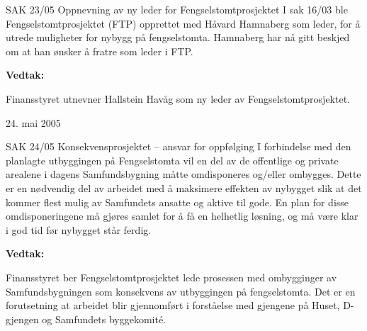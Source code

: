 \begin{instruksledd}{SAK 23/05 Oppnevning av ny leder for Fengselstomtprosjektet}
    I sak 16/03 ble Fengselstomtprosjektet (FTP) opprettet med Håvard Hamnaberg som leder,
    for å utrede muligheter for
    nybygg på fengselstomta. Hamnaberg har nå gitt beskjed om at han ønsker å fratre som
    leder i FTP.

    \textbf{Vedtak:}

    Finansstyret utnevner Hallstein Havåg som ny leder av Fengselstomtprosjektet.
    
    24. mai 2005
\end{instruksledd}
\begin{instruksledd}{SAK 24/05 Konsekvensprosjektet – ansvar for oppfølging}
    I forbindelse med den planlagte utbyggingen på Fengselstomta vil en del av de
    offentlige og private arealene i dagens
    Samfundsbygning måtte omdisponeres og/eller ombygges. Dette er en nødvendig del av
    arbeidet med å maksimere
    effekten av nybygget slik at det kommer flest mulig av Samfundets ansatte og aktive
    til gode. En plan for disse
    omdisponeringene må gjøres samlet for å få en helhetlig løsning, og må være klar i god
    tid før nybygget står ferdig.

    \textbf{Vedtak:}

    Finansstyret ber Fengselstomtprosjektet lede prosessen med ombygginger av
    Samfundsbygningen som konsekvens av
    utbyggingen på fengselstomta. Det er en forutsetning at arbeidet blir gjennomført i
    forståelse med gjengene på Huset, D-gjengen og Samfundets byggekomit\'e.
\end{instruksledd}


\clearpage


